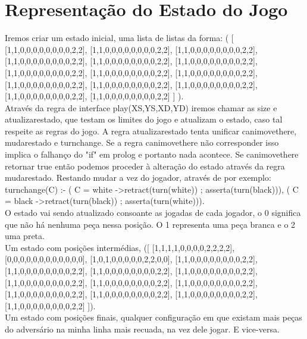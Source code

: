 \documentclass[a4paper]{article}
\begin{document}
\clearpage
\section{Representação do Estado do Jogo}
Iremos criar um estado inicial, uma lista de listas da forma:
( [ [1,1,0,0,0,0,0,0,0,0,2,2], [1,1,0,0,0,0,0,0,0,0,2,2], [1,1,0,0,0,0,0,0,0,0,2,2],
          [1,1,0,0,0,0,0,0,0,0,2,2], [1,1,0,0,0,0,0,0,0,0,2,2], [1,1,0,0,0,0,0,0,0,0,2,2],
          [1,1,0,0,0,0,0,0,0,0,2,2], [1,1,0,0,0,0,0,0,0,0,2,2], [1,1,0,0,0,0,0,0,0,0,2,2],
          [1,1,0,0,0,0,0,0,0,0,2,2], [1,1,0,0,0,0,0,0,0,0,2,2], [1,1,0,0,0,0,0,0,0,0,2,2],
          [1,1,0,0,0,0,0,0,0,0,2,2], [1,1,0,0,0,0,0,0,0,0,2,2] ] ).
\\\linebreak
Através da regra de interface play(XS,YS,XD,YD) iremos chamar as size e atualizarestado, que testam os limites do jogo e atualizam o estado, caso tal respeite as regras do jogo. A regra atualizarestado tenta unificar canimovethere, mudarestado e turnchange. Se a regra canimovethere não corresponder isso implica o falhanço do "if" em prolog e portanto nada acontece. Se canimovethere retornar true então podemos proceder à alteração do estado através da regra mudarestado. Restando mudar a vez do jogador, através de por exemplo:
\\\linebreak
turnchange(C) :-
  ( C = white -\textgreater retract(turn(white)) ; asserta(turn(black))),
  ( C = black -\textgreater retract(turn(black)) ; asserta(turn(white))).
\\\linebreak
O estado vai sendo atualizado consoante as jogadas de cada jogador, o 0 significa que não há nenhuma peça nessa posição. O 1 representa uma peça branca e o 2 uma preta.
\\\linebreak Um estado com posições intermédias, ([ [1,1,1,1,0,0,0,0,2,2,2,2], [0,0,0,0,0,0,0,0,0,0,0,0], [1,0,1,0,0,0,0,0,2,2,0,0],
          [1,1,0,0,0,0,0,0,0,0,2,2], [1,1,0,0,0,0,0,0,0,0,2,2], [1,1,0,0,0,0,0,0,0,0,2,2],
          [1,1,0,0,0,0,0,0,0,0,2,2], [1,1,0,0,0,0,0,0,0,0,2,2], [1,1,0,0,0,0,0,0,0,0,2,2],
          [1,1,0,0,0,0,0,0,0,0,2,2], [1,1,0,0,0,0,0,0,0,0,2,2], [1,1,0,0,0,0,0,0,0,0,2,2],
        [1,1,0,0,0,0,0,0,0,0,2,2], [1,1,0,0,0,0,0,0,0,0,2,2] ]).
\\\linebreak
Um estado com posições finais, qualquer configuração em que existam mais peças do adversário na minha linha mais recuada, na vez dele jogar. E vice-versa.
\end{document}
